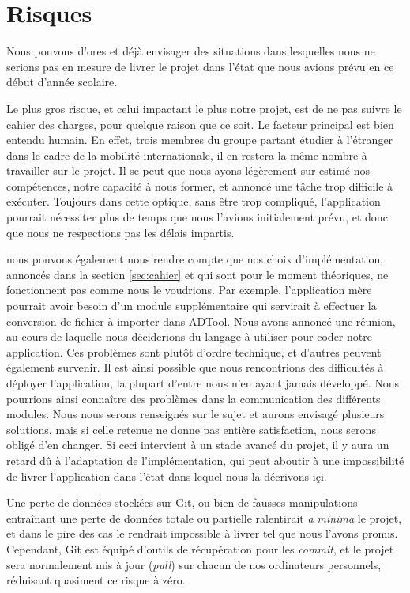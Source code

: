\section{Risques}
    Nous pouvons d'ores et déjà envisager des situations dans lesquelles nous ne serions pas en mesure de livrer le projet dans l'état que nous avions prévu en ce début d'année scolaire.

    Le plus gros risque, et celui impactant le plus notre projet, est de ne pas suivre le cahier des charges, pour quelque raison que ce soit.
    Le facteur principal est bien entendu humain. En effet, trois membres du groupe partant étudier à l'étranger dans le cadre de la mobilité internationale, il en restera la même nombre à travailler sur le projet. Il se peut que nous ayons légèrement sur-estimé nos compétences, notre capacité à nous former, et annoncé une tâche trop difficile à exécuter. Toujours dans cette optique, sans être trop compliqué, l'application pourrait nécessiter plus de temps que nous l'avions initialement prévu, et donc que nous ne respections pas les délais impartis.

    nous pouvons également nous rendre compte que nos choix d'implémentation, annoncés dans la section \ref{sec:cahier} et qui sont pour le moment théoriques, ne fonctionnent pas comme nous le voudrions. Par exemple, l'application mère pourrait avoir besoin d'un module supplémentaire qui servirait à effectuer la conversion de fichier à importer dans ADTool. Nous avons annoncé une réunion, au cours de laquelle nous déciderions du langage à utiliser pour coder notre application.
    Ces problèmes sont plutôt d'ordre technique, et d'autres peuvent également survenir. Il est ainsi possible que nous rencontrions des difficultés à déployer l'application, la plupart d'entre nous n'en ayant jamais développé. Nous pourrions ainsi connaître des problèmes dans la communication des différents modules. Nous nous serons renseignés sur le sujet et aurons envisagé plusieurs solutions, mais si celle retenue ne donne pas entière satisfaction, nous serons obligé d'en changer. Si ceci intervient à un stade avancé du projet, il y aura un retard dû à l'adaptation de l'implémentation, qui peut aboutir à une impossibilité de livrer l'application dans l'état dans lequel nous la décrivons içi.

    Une perte de données stockées sur Git, ou bien de fausses manipulations entraînant une perte de données totale ou partielle ralentirait \textit{a minima} le projet, et dans le pire des cas le rendrait impossible à livrer tel que nous l'avons promis. Cependant, Git est équipé d'outils de récupération pour les \textit{commit}, et le projet sera normalement mis à jour (\textit{pull}) sur chacun de nos ordinateurs personnels, réduisant quasiment ce risque à zéro.

